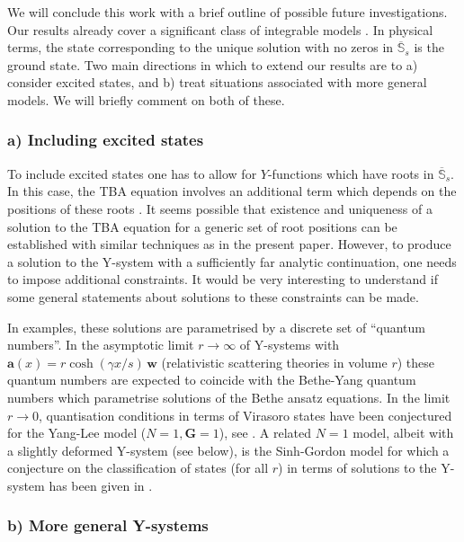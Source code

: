 \documentclass[12pt]{article}
\theoremstyle{plain}
\theoremstyle{definition}
\numberwithin{equation}{section}
\numberwithin{theorem}{section}
\renewcommand{\vec}[1]{\mathbf{#1}}
\begin{document}
\medskip

We will conclude this work with a brief outline of possible future investigations. Our results already cover a significant class of integrable models \cite{Zamo:ADE,KlassenMelzer91}. In physical terms, the state corresponding to the unique solution with no zeros in $\overline{\mathbb{S}}_s$ is the
	ground state.
Two main directions in which to extend our results are to a) consider excited states, and b) treat situations associated with more general models. We will briefly comment on both of these.


\subsubsection*{a) Including excited states}

To include excited states one has to allow for $Y$-functions which
have roots in $\overline{\mathbb{S}}_s$. 
In this case, 
the TBA equation involves an additional term which depends on the positions of these roots \cite{KluemperPearce,DoreyTateo:YL,BLZ4}.
It seems possible that existence and
uniqueness of a solution to the TBA equation for a generic set of root positions can be established with similar techniques as in the present paper.
However, to produce a solution to the Y-system with a sufficiently far analytic continuation, one needs to impose additional constraints. 
It would be very interesting to understand if some general statements about solutions to these constraints can be made.

In examples, these solutions are parametrised by a discrete set of ``quantum numbers''.
In the asymptotic limit $r\to \infty$ of Y-systems with $\vec{a}(x) = r \cosh(\gamma x/s) \, \vec{w}$ (relativistic scattering theories in volume $r$) these quantum numbers are expected to coincide with the Bethe-Yang quantum numbers \cite{YangYang69} which parametrise solutions of the Bethe ansatz equations. In the limit $r\to 0$, quantisation conditions in terms of Virasoro states have been conjectured for the Yang-Lee model ($N=1,\vec{G}=1$), see \cite{BajnokDeebPearce}. A related $N=1$ model, albeit with a slightly deformed Y-system (see below), is the Sinh-Gordon model for which a conjecture on the classification of states (for all $r$) in terms of solutions to the Y-system
	has been given in 
\cite{Teschner}.



\subsubsection*{b) More general Y-systems}
\end{document}
